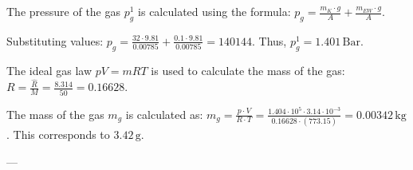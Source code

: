 The pressure of the gas \( p_g^1 \) is calculated using the formula:  
\( p_g = \frac{m_K \cdot g}{A} + \frac{m_{EW} \cdot g}{A} \).  

Substituting values:  
\( p_g = \frac{32 \cdot 9.81}{0.00785} + \frac{0.1 \cdot 9.81}{0.00785} = 140144 \).  
Thus, \( p_g^1 = 1.401 \, \text{Bar} \).  

The ideal gas law \( pV = mRT \) is used to calculate the mass of the gas:  
\( R = \frac{\hat{R}}{M} = \frac{8.314}{50} = 0.16628 \).  

The mass of the gas \( m_g \) is calculated as:  
\( m_g = \frac{p \cdot V}{R \cdot T} = \frac{1.404 \cdot 10^5 \cdot 3.14 \cdot 10^{-3}}{0.16628 \cdot (773.15)} = 0.00342 \, \text{kg} \).  
This corresponds to \( 3.42 \, \text{g} \).  

---